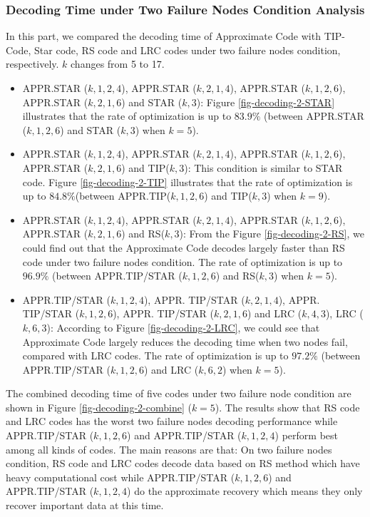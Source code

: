 \documentclass[sigconf]{acmart}
\begin{document}
\subsubsection{Decoding Time under Two Failure Nodes Condition Analysis}
In this part, we compared the decoding time of Approximate Code with TIP-Code, Star code, RS code and LRC codes under two failure nodes condition, respectively. $k$ changes from 5 to 17.
\begin{itemize}
    \item APPR.STAR ($k,1,2,4$), APPR.STAR ($k,2,1,4$), APPR.STAR ($k,1,2,6$), APPR.STAR ($k,2,1,6$) and STAR ($k,3$): Figure \ref{fig-decoding-2-STAR} illustrates that the rate of optimization is up to $83.9\%$ (between APPR.STAR ($k,1,2,6$) and STAR ($k,3$) when $k = 5$).
    \item APPR.STAR ($k,1,2,4$), APPR.STAR ($k,2,1,4$),  APPR.STAR ($k,1,2,6$), APPR.STAR ($k,2,1,6$) and TIP($k,3$): This condition is similar to STAR code. Figure \ref{fig-decoding-2-TIP} illustrates that the rate of optimization is up to $84.8\% $(between APPR.TIP($k,1,2,6$) and TIP($k,3$) when $k = 9$).
    \item APPR.STAR ($k,1,2,4$), APPR.STAR ($k,2,1,4$),  APPR.STAR ($k,1,2,6$), APPR.STAR ($k,2,1,6$) and RS($k,3$): From the Figure \ref{fig-decoding-2-RS}, we could find out that the Approximate Code decodes largely faster than RS code under two failure nodes condition. The rate of optimization is up to $96.9\%$ (between APPR.TIP/STAR ($k,1,2,6$) and RS($k,3$) when $k = 5$).
    \item APPR.TIP/STAR ($k,1,2,4$), APPR. TIP/STAR ($k,2,1,4$),  APPR. TIP/STAR ($k,1,2,6$), APPR. TIP/STAR ($k,2,1,6$) and LRC ($k,4,3$), LRC ($k,6,3$):
    According to Figure \ref{fig-decoding-2-LRC}, we could see that Approximate Code largely reduces the decoding time when two nodes fail, compared with LRC codes. The rate of optimization is up to $97.2\%$ (between APPR.TIP/STAR ($k,1,2,6$) and LRC ($k, 6, 2$) when $k = 5$).
\end{itemize}

The combined decoding time of five codes under two failure node condition are shown in Figure \ref{fig-decoding-2-combine} ($k=5$). The results show that RS code and LRC codes has the worst two failure nodes decoding performance while APPR.TIP/STAR ($k,1,2,6$) and APPR.TIP/STAR ($k,1,2,4$) perform best among all kinds of codes. The main reasons are that: On two failure nodes condition, RS code and LRC codes decode data based on RS method which have heavy computational cost while APPR.TIP/STAR ($k,1,2,6$) and APPR.TIP/STAR ($k,1,2,4$) do the approximate recovery which means they only recover important data at this time.
\end{document}
